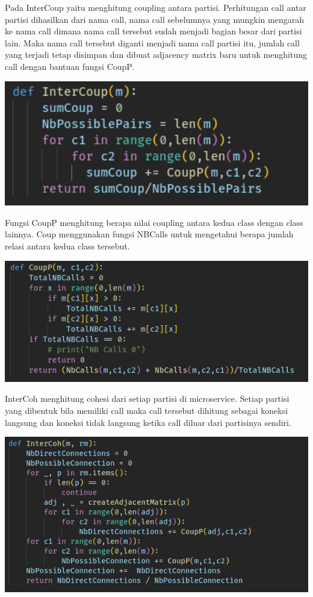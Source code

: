 Pada InterCoup yaitu menghitung coupling antara partisi. Perhitungan call antar partisi dihasilkan dari nama call, nama call sebelumnya yang mungkin mengarah ke nama call dimana nama call tersebut sudah menjadi bagian besar dari partisi lain. Maka nama call tersebut diganti menjadi nama call partisi itu, jumlah call yang terjadi tetap disimpan dan dibuat adjacency matrix baru untuk menghitung call dengan bantuan fungsi CoupP.
\begin{center}
	\includegraphics[width=14cm]{img/bab_3/InterCoup.png}
	\label{fig:asd}
\end{center}
Fungsi CoupP menghitung berapa nilai coupling antara kedua class dengan class lainnya. Coup menggunakan fungsi NBCalls untuk mengetahui berapa jumlah relasi antara kedua class tersebut.
\begin{center}
	\includegraphics[width=14cm]{img/bab_3/CoupP.png}
	\label{fig:asd}
\end{center}

InterCoh menghitung cohesi dari setiap partisi di microservice. Setiap partisi yang dibentuk bila memiliki call maka call tersebut dihitung sebagai koneksi langsung dan koneksi tidak langsung ketika call diluar dari partisinya sendiri.
\begin{center}
	\includegraphics[width=14cm]{img/bab_3/InterCoh.png}
	\label{fig:asd}
\end{center}

